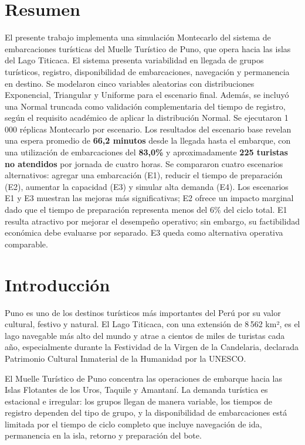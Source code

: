 \documentclass[12pt,a4paper]{article}
\begin{document}
\section{Resumen}

El presente trabajo implementa una simulación Montecarlo del sistema de
embarcaciones turísticas del Muelle Turístico de Puno, que opera hacia las
islas del Lago Titicaca. El sistema presenta variabilidad en llegada de
grupos turísticos, registro, disponibilidad de embarcaciones, navegación y
permanencia en destino. Se modelaron cinco variables aleatorias con
distribuciones Exponencial, Triangular y Uniforme para el escenario final.
Además, se incluyó una Normal truncada como validación complementaria del
tiempo de registro, según el requisito académico de aplicar la distribución
Normal. Se ejecutaron 1\,000
réplicas Montecarlo por escenario. Los resultados del escenario base
revelan una espera promedio de \textbf{66,2 minutos} desde la llegada
hasta el embarque, con una utilización de embarcaciones del \textbf{83,0\%}
y aproximadamente \textbf{225 turistas no atendidos} por jornada de cuatro
horas. Se compararon cuatro escenarios alternativos: agregar una
embarcación (E1), reducir el tiempo de preparación (E2), aumentar la
capacidad (E3) y simular alta demanda (E4). Los escenarios E1 y E3
muestran las mejoras más significativas; E2 ofrece un impacto marginal
dado que el tiempo de preparación representa menos del 6\% del ciclo total.
E1 resulta atractivo por mejorar el desempeño operativo; sin embargo, su
factibilidad económica debe evaluarse por separado. E3 queda como alternativa
operativa comparable.

\newpage

\section{Introducción}

Puno es uno de los destinos turísticos más importantes del Perú por su
valor cultural, festivo y natural. El Lago Titicaca, con una extensión de
8\,562 km², es el lago navegable más alto del mundo y atrae a cientos de
miles de turistas cada año, especialmente durante la Festividad de la
Virgen de la Candelaria, declarada Patrimonio Cultural Inmaterial de la
Humanidad por la UNESCO.

El Muelle Turístico de Puno concentra las operaciones de embarque hacia
las Islas Flotantes de los Uros, Taquile y Amantaní. La demanda turística
es estacional e irregular: los grupos llegan de manera variable, los
tiempos de registro dependen del tipo de grupo, y la disponibilidad de
embarcaciones está limitada por el tiempo de ciclo completo que incluye
navegación de ida, permanencia en la isla, retorno y preparación del bote.
\end{document}
